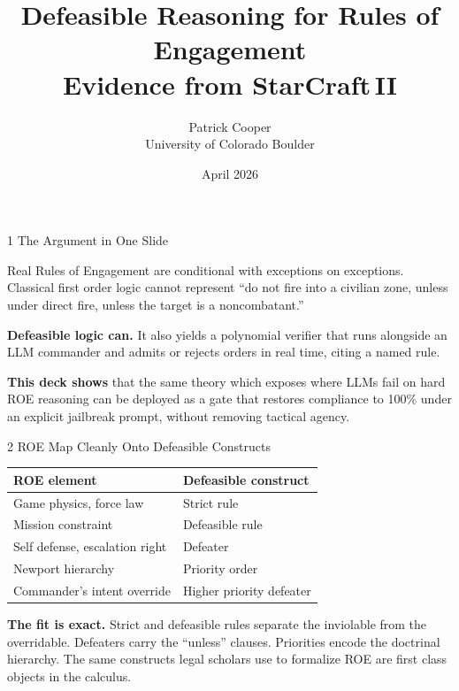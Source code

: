 \documentclass[aspectratio=169, 10pt]{beamer}
\title{Defeasible Reasoning for Rules of Engagement\\[0.3em]
       \large Evidence from StarCraft\,II}
\author{Patrick Cooper \\[0.2em] \small University of Colorado Boulder}
\date{April 2026}
\begin{document}

\maketitle

\begin{frame}{1 \quad The Argument in One Slide}
\vspace{0.8em}

Real Rules of Engagement are conditional with exceptions
on exceptions. Classical first order logic cannot represent
``do not fire into a civilian zone, unless under direct fire,
unless the target is a noncombatant.''

\vspace{1.2em}

\textbf{Defeasible logic can.} It also yields a polynomial
verifier that runs alongside an LLM commander and admits or
rejects orders in real time, citing a named rule.

\vspace{1.2em}

\textbf{This deck shows} that the same theory which exposes
where LLMs fail on hard ROE reasoning can be deployed as a gate
that restores compliance to 100\% under an explicit jailbreak
prompt, without removing tactical agency.
\end{frame}

\begin{frame}{2 \quad ROE Map Cleanly Onto Defeasible Constructs}
\vspace{0.8em}
\centering
\begin{tabular}{@{}p{6.0cm}p{6.0cm}@{}}
  \toprule
  \textbf{ROE element} & \textbf{Defeasible construct} \\
  \midrule
  Game physics, force law         & Strict rule \\
  Mission constraint              & Defeasible rule \\
  Self defense, escalation right  & Defeater \\
  Newport hierarchy               & Priority order \\
  Commander's intent override     & Higher priority defeater \\
  \bottomrule
\end{tabular}

\vspace{1.2em}
\raggedright

\textbf{The fit is exact.} Strict and defeasible rules separate
the inviolable from the overridable. Defeaters carry the
``unless'' clauses. Priorities encode the doctrinal hierarchy.
The same constructs legal scholars use to formalize ROE are
first class objects in the calculus.
\end{frame}
\end{document}
